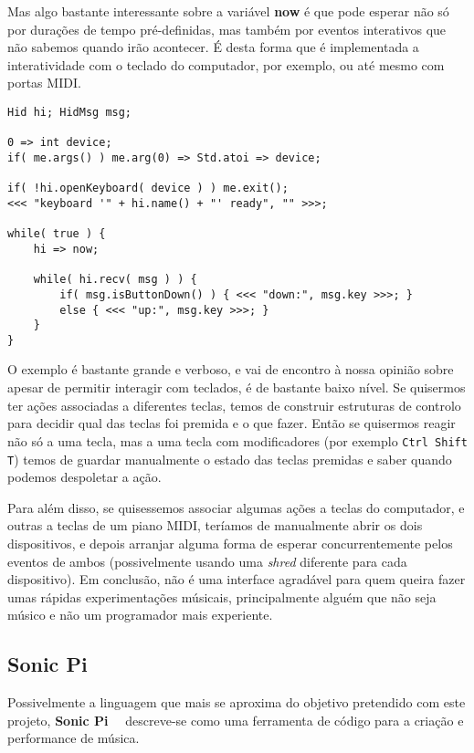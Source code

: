 Mas algo bastante interessante sobre a variável \textbf{now} é que pode esperar não só por durações de tempo pré-definidas, mas também por eventos interativos que não sabemos quando irão acontecer. É desta forma que é implementada a interatividade com o teclado do computador, por exemplo, ou até mesmo com portas MIDI.

\begin{lstlisting}[caption={Exemplos de instruções de avanço no tempo},label={lst:chuck-5}]
Hid hi; HidMsg msg;

0 => int device;
if( me.args() ) me.arg(0) => Std.atoi => device;

if( !hi.openKeyboard( device ) ) me.exit();
<<< "keyboard '" + hi.name() + "' ready", "" >>>;

while( true ) {
    hi => now;

    while( hi.recv( msg ) ) {
        if( msg.isButtonDown() ) { <<< "down:", msg.key >>>; } 
        else { <<< "up:", msg.key >>>; }
    }
}
\end{lstlisting}

O exemplo é bastante grande e verboso, e vai de encontro à nossa opinião sobre apesar de permitir interagir com teclados, é de bastante baixo nível. Se quisermos ter ações associadas a diferentes teclas, temos de construir estruturas de controlo para decidir qual das teclas foi premida e o que fazer. Então se quisermos reagir não só a uma tecla, mas a uma tecla com modificadores (por exemplo \texttt{Ctrl Shift T}) temos de guardar manualmente o estado das teclas premidas e saber quando podemos despoletar a ação.

Para além disso, se quisessemos associar algumas ações a teclas do computador, e outras a teclas de um piano MIDI, teríamos de manualmente abrir os dois dispositivos, e depois arranjar alguma forma de esperar concurrentemente pelos eventos de ambos (possivelmente usando uma \textit{shred} diferente para cada dispositivo).
Em conclusão, não é uma interface agradável para quem queira fazer umas rápidas experimentações músicais, principalmente alguém que não seja músico e não um programador mais experiente.

\subsection{Sonic Pi}
Possivelmente a linguagem que mais se aproxima do objetivo pretendido com este projeto, \textbf{Sonic Pi}~\cite{doi:SonicPi}~\cite{sonic-pi} descreve-se como uma ferramenta de código para a criação e performance de música.

